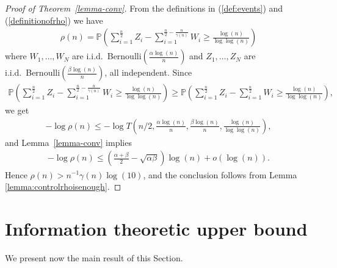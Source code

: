 \documentclass[english]{article}
\newcommand{\1}{\textbf{1}}
\newcommand{\pp}{\frac{\alpha\log(n)}{n}}
\newcommand{\qq}{\frac{\beta\log(n)}{n}}
\newcommand{\p}{\mathbb{P}}
\begin{document}
\begin{proof}[Proof of Theorem~\ref{lemma-conv}]
From the definitions in (\ref{def:events}) and (\ref{definitionofrho}) we have 
\begin{align}
\rho(n)=\p\left( \sum_{i=1}^{\frac{n}2} Z_i -  \sum_{i=1}^{\frac{n}2- \frac{n}{\gamma(n)}} W_i \geq \frac{\log(n)}{\log\log(n)} \right) 
\end{align}
where $W_1,\dots, W_N$ are i.i.d.\ Bernoulli$\left(\pp \right)$ and $Z_1,\dots, Z_N$ are i.i.d.\ Bernoulli$\left(\qq \right)$, all independent.
Since
\begin{align}
\p\left( \sum_{i=1}^{\frac{n}2} Z_i -  \sum_{i=1}^{\frac{n}2- \frac{n}{\gamma(n)}} W_i \geq \frac{\log(n)}{\log\log(n)} \right) \geq \p\left( \sum_{i=1}^{\frac{n}2} Z_i -  \sum_{i=1}^{\frac{n}2} W_i \geq \frac{\log(n)}{\log\log(n)} \right) ,
\end{align}
we get
\begin{align}
- \log \rho(n) \leq - \log T \left(n/2, \pp, \qq, \frac{\log(n)}{\log\log(n)}\right),
\end{align}
and Lemma~\ref{lemma-conv} implies 
\begin{align}
- \log \rho(n) \leq  \left( \frac{\alpha + \beta}2 - \sqrt{\alpha \beta} \right) \log(n) + o(\log(n)).
\end{align}
Hence $\rho(n) > n^{-1}\gamma(n)\log(10)$, and the conclusion follows from Lemma \ref{lemma:controlrhoisenough}.
\end{proof}


































\section{Information theoretic upper bound}



We present now the main result of this Section.
\end{document}
